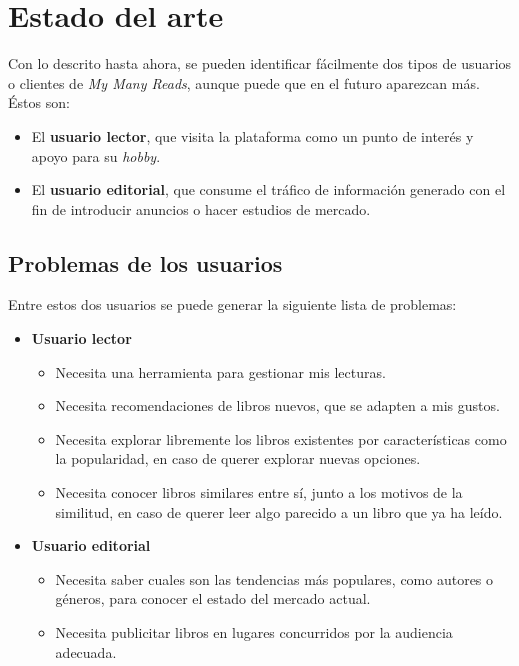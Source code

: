 \chapter{Estado del arte}
\label{Estado del arte}

Con lo descrito hasta ahora, se pueden identificar fácilmente dos tipos de usuarios o clientes de \textit{My Many Reads}, aunque puede que en el futuro aparezcan más. Éstos son:
\begin{itemize}
    \item El \textbf{usuario lector}, que visita la plataforma como un punto de interés y apoyo para su \textit{hobby}.
    \item El \textbf{usuario editorial}, que consume el tráfico de información generado con el fin de introducir anuncios o hacer estudios de mercado.
\end{itemize}

\section{Problemas de los usuarios}

Entre estos dos usuarios se puede generar la siguiente lista de problemas:
\begin{itemize}
    \item \textbf{Usuario lector}
    \begin{itemize}
        \item Necesita una herramienta para gestionar mis lecturas.
        \item Necesita recomendaciones de libros nuevos, que se adapten a mis gustos.
        \item Necesita explorar libremente los libros existentes por características como la popularidad, en caso de querer explorar nuevas opciones.
        \item Necesita conocer libros similares entre sí, junto a los motivos de la similitud, en caso de querer leer algo parecido a un libro que ya ha leído.
    \end{itemize}
    \item \textbf{Usuario editorial}
    \begin{itemize}
        \item Necesita saber cuales son las tendencias más populares, como autores o géneros, para conocer el estado del mercado actual.
        \item Necesita publicitar libros en lugares concurridos por la audiencia adecuada.
    \end{itemize}
\end{itemize}


